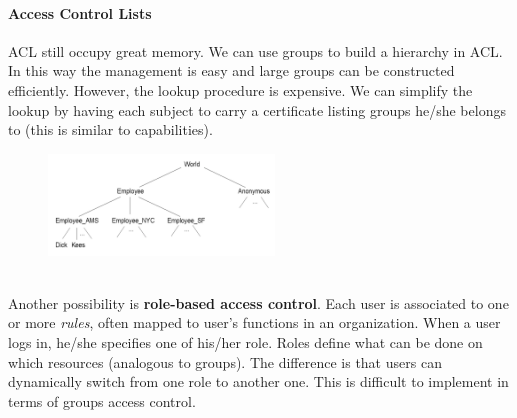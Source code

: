 \documentclass[10pt,a4paper]{article}
\begin{document}
\paragraph{Access Control Lists}
ACL still occupy great memory. We can use groups to build a hierarchy in ACL. In this way the management is easy and large groups can be constructed efficiently. However, the lookup procedure is expensive. We can simplify the lookup by having each subject to carry a certificate listing groups he/she belongs to (this is similar to capabilities).
\begin{figure}[h!]\hfill \includegraphics[width=170pt]{images/acl-tree.png}\hspace*{\fill}
  \label{fig:acl-tree}
\end{figure} \\
Another possibility is \textbf{role-based access control}. Each user is associated to one or more \textit{rules}, often mapped to user's functions in an organization. When a user logs in, he/she specifies one of his/her role. Roles define what can be done on which resources (analogous to groups). The difference is that users can dynamically switch from one role to another one. This is difficult to implement in terms of groups access control.
\end{document}
